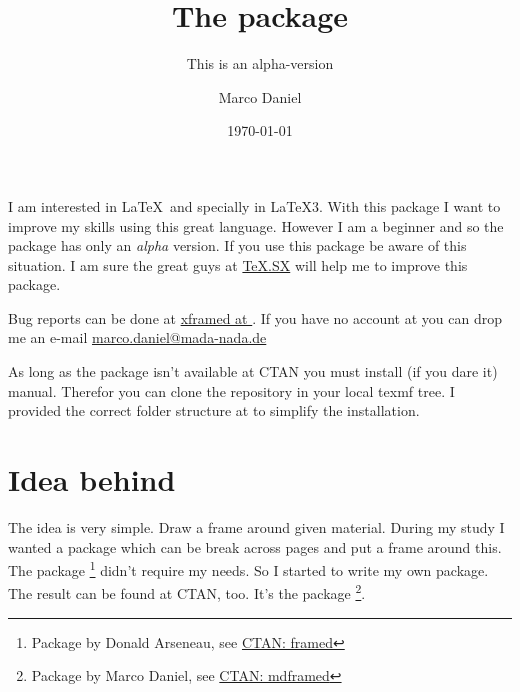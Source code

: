 \documentclass[openany,12pt,tocdepth=3,showframe]{ltx-md}
\begin{document}
\title{The  package}
\subtitle{This is an alpha-version}
\author{Marco Daniel}
\date{\today}
\maketitle
\clearpage
{}
\tableofcontents
{}
\label{sec:intro}
I am interested in \LaTeX\ and specially in \LaTeX3. With this package I want
to improve my skills using this great language. However I am a beginner and
so the package has only an \textit{alpha} version. If you use this package
be aware of this situation. I am sure the great guys at
\faArrowRight\href{http://tex.stackexchange.com/}{TeX.SX} will help me to improve this package.


\label{sec:bug-reports}
Bug reports can be done at
\href{https://github.com/marcodaniel/xframed/issues}{xframed at \Github}. If you have no
account at \Github you can drop me an e-mail
\href{mailto:marco.daniel@mada-nada.de}{\faEnvelope marco.daniel@mada-nada.de}

As long as the package isn't available at CTAN you must install (if you dare it)
manual. Therefor you can clone the repository in your local texmf tree. I provided
the correct folder structure at \Github to simplify the installation.

\chapter{Idea behind \texorpdfstring{}{xframed}}\label{chap:idea}

The idea is very simple. Draw a frame around given material. During my study 
I wanted a package which can be break across pages and put a frame around this.
The package \footnote{Package  by Don­ald Arse­neau, 
see \href{http://www.ctan.org/pkg/framed}{CTAN: framed}} didn't require my needs.
So I started to write my own package. The result can be found at CTAN, too. It's the
package \footnote{Package  by Marco Daniel, 
see \href{http://www.ctan.org/pkg/mdframed}{CTAN: mdframed}}.
\end{document}
